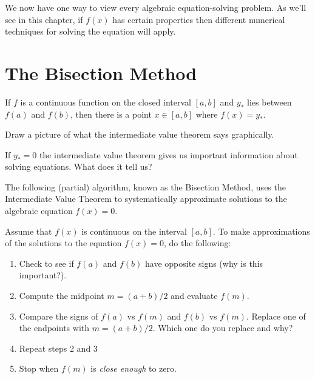 We now have one way to view every algebraic equation-solving problem.  As we'll see in
this chapter, if $f(x)$ has certain properties then different numerical techniques for
solving the equation will apply.

\section{The Bisection Method}

\begin{thm}
    If $f$ is a continuous function on the closed interval $[a,b]$ and $y_*$ lies between
    $f(a)$ and $f(b)$, then there is a point $x \in [a,b]$ where $f(x) = y_*$.
    \label{thm:IVT}
\end{thm}


\begin{problem}
    Draw a picture of what the intermediate value theorem says graphically.
\end{problem}

\begin{problem}
    If $y_*=0$ the intermediate value theorem gives us important information about solving
    equations.  What does it tell us?
\end{problem}


The following (partial) algorithm, known as the Bisection Method, uses the Intermediate
Value Theorem to systematically approximate solutions to the algebraic equation $f(x) =
0$.
\begin{algorithm}
    Assume that $f(x)$ is continuous on the interval $[a,b]$. To make approximations of
    the solutions to the equation $f(x) = 0$, do the following:
    \begin{enumerate}
        \item Check to see if $f(a)$ and $f(b)$ have opposite signs
            (why is this important?).
        \item Compute the midpoint $m=(a+b)/2$ and evaluate $f(m)$.
        \item Compare the signs of $f(a)$ vs $f(m)$ and $f(b)$ vs $f(m)$.  Replace one of
            the endpoints with $m=(a+b)/2$. Which one do you replace and why?
        \item Repeat steps 2 and 3
        \item Stop when $f(m)$ is {\it close enough} to zero.
    \end{enumerate}
\end{algorithm}

